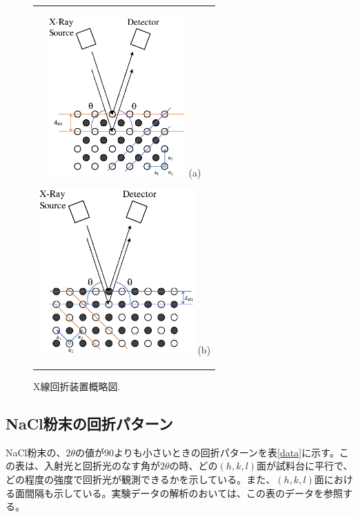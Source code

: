 \documentclass[11pt,a4j,uplatex]{jsarticle}
\begin{document}
\begin{figure}[ht]
 \centering
 \begin{tabular}{c}

  \begin{minipage}{0.5\hsize}
   \centering
   \includegraphics[clip, width=5.3cm]{2theta.eps}
   \hspace{2cm} (a)
  \end{minipage}

  \begin{minipage}{0.5\hsize}
   \centering
   \includegraphics[clip, width=6cm]{2theta3.eps}
   \hspace{2cm} (b)
  \end{minipage}

 \end{tabular}
 \caption{X線回折装置概略図.}
 \label{thetatheta}

\end{figure}

\newpage
\subsection{NaCl粉末の回折パターン}

NaCl粉末の、$2\theta$の値が90よりも小さいときの回折パターンを表\ref{data}に示す。この表は、入射光と回折光のなす角が$2\theta$の時、どの$(h,k,l)$面が試料台に平行で、どの程度の強度で回折光が観測できるかを示している。また、$(h,k,l)$面における面間隔も示している。実験データの解析のおいては、この表のデータを参照する。
\end{document}
